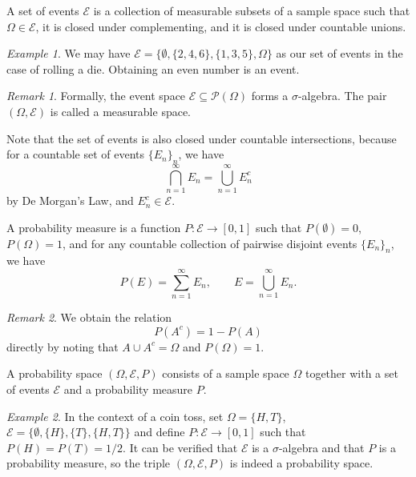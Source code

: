 \documentclass[11pt]{article}
\theoremstyle{definition}
\theoremstyle{remark}
\newtheorem*{remark}{Remark}
\newtheorem*{example}{Example}
\numberwithin{equation}{section}
\begin{document}
    \begin{definition}[Events]
        A set of events $\mathcal{E}$ is a collection of measurable subsets of
        a sample space such that $\Omega \in \mathcal{E}$, it is closed under
        complementing, and it is closed under countable unions.
    \end{definition}
    \begin{example}
        We may have $\mathcal{E} = \{\emptyset, \{2, 4, 6\}, \{1, 3, 5\},
        \Omega\}$ as our set of events in the case of rolling a die.
        Obtaining an even number is an event.
    \end{example}
    \begin{remark}
        Formally, the event space $\mathcal{E} \subseteq \mathcal{P}(\Omega)$ forms
        a $\sigma$-algebra. The pair $(\Omega, \mathcal{E})$ is called a measurable
        space.
    \end{remark}

    Note that the set of events is also closed under countable intersections,
    because for a countable set of events $\{E_n\}_n$, we have \[
        \bigcap_{n = 1}^\infty E_n = \bigcup_{n = 1}^\infty E_n^c
    \] by De Morgan's Law, and $E_n^c \in \mathcal{E}$.
    
    \begin{definition}[Probability]
        A probability measure is a function $P\colon \mathcal{E} \to [0, 1]$ such
        that $P(\emptyset) = 0$, $P(\Omega) = 1$, and for any countable collection of
        pairwise disjoint events $\{E_n\}_n$, we have \[
            P(E) = \sum_{n = 1}^\infty E_n, \qquad E = \bigcup_{n = 1}^\infty E_n.
        \] 
    \end{definition}
    \begin{remark}
        We obtain the relation \[
            P(A^c) = 1 - P(A)
        \] directly by noting that $A \cup A^c = \Omega$ and $P(\Omega) = 1$.
    \end{remark}

    \begin{definition}
        A probability space $(\Omega, \mathcal{E}, P)$ consists of a sample space
        $\Omega$ together with a set of events $\mathcal{E}$ and a probability
        measure $P$.
    \end{definition}
    \begin{example}
        In the context of a coin toss, set $\Omega = \{H, T\}$, $\mathcal{E} =
        \{\emptyset, \{H\}, \{T\}, \{H, T\}\}$ and define $P\colon \mathcal{E} \to
        [0, 1]$ such that $P(H) = P(T) = 1 /2$. It can be verified that
        $\mathcal{E}$ is a $\sigma$-algebra and that $P$ is a probability measure,
        so the triple $(\Omega, \mathcal{E}, P)$ is indeed a probability space.
    \end{example}
\end{document}

